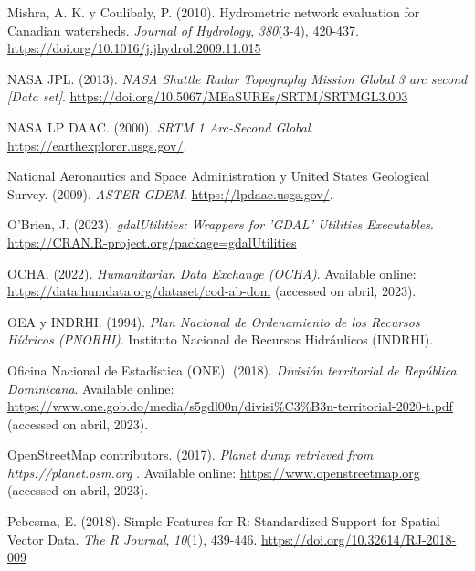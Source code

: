 \documentclass[spanish]{article}
\newlength{\cslhangindent}
\newlength{\cslentryspacingunit} %
\newenvironment{CSLReferences}[2] %
 {%
  \setlength{\parindent}{0pt}
  \ifodd #1
  \let\oldpar\par
  \def\par{\hangindent=\cslhangindent\oldpar}
  \fi
  \setlength{\parskip}{#2\cslentryspacingunit}
 }%
 {}
\begin{document}
\begin{CSLReferences}{1}{0}
\leavevmode{}%
Mishra, A. K. y Coulibaly, P. (2010). Hydrometric network evaluation for
Canadian watersheds. \emph{Journal of Hydrology}, \emph{380}(3-4),
420-437. \url{https://doi.org/10.1016/j.jhydrol.2009.11.015}

\leavevmode{}%
NASA JPL. (2013). \emph{NASA Shuttle Radar Topography Mission Global 3
arc second {[}Data set{]}}.
\url{https://doi.org/10.5067/MEaSUREs/SRTM/SRTMGL3.003}

\leavevmode{}%
NASA LP DAAC. (2000). \emph{SRTM 1 Arc-Second Global}.
\url{https://earthexplorer.usgs.gov/}.

\leavevmode{}%
National Aeronautics and Space Administration y United States Geological
Survey. (2009). \emph{{ASTER GDEM}}. \url{https://lpdaac.usgs.gov/}.

\leavevmode{}%
O'Brien, J. (2023). \emph{gdalUtilities: Wrappers for 'GDAL' Utilities
Executables}. \url{https://CRAN.R-project.org/package=gdalUtilities}

\leavevmode{}%
OCHA. (2022). \emph{{Humanitarian Data Exchange (OCHA)}}. Available
online: \url{https://data.humdata.org/dataset/cod-ab-dom} (accessed on
abril, 2023).

\leavevmode{}%
OEA y INDRHI. (1994). \emph{{Plan Nacional de Ordenamiento de los
Recursos Hídricos (PNORHI)}}. {Instituto Nacional de Recursos
Hidráulicos (INDRHI)}.

\leavevmode{}%
Oficina Nacional de Estadística (ONE). (2018). \emph{{División
territorial de República Dominicana}}. Available online:
\url{https://www.one.gob.do/media/s5gdl00n/divisi\%C3\%B3n-territorial-2020-t.pdf}
(accessed on abril, 2023).

\leavevmode{}%
OpenStreetMap contributors. (2017). \emph{{Planet dump retrieved from
https://planet.osm.org }}. Available online:
\url{https://www.openstreetmap.org} (accessed on abril, 2023).

\leavevmode{}%
Pebesma, E. (2018). {Simple Features for R: Standardized Support for
Spatial Vector Data}. \emph{{The R Journal}}, \emph{10}(1), 439-446.
\url{https://doi.org/10.32614/RJ-2018-009}


\end{CSLReferences}
\end{document}

